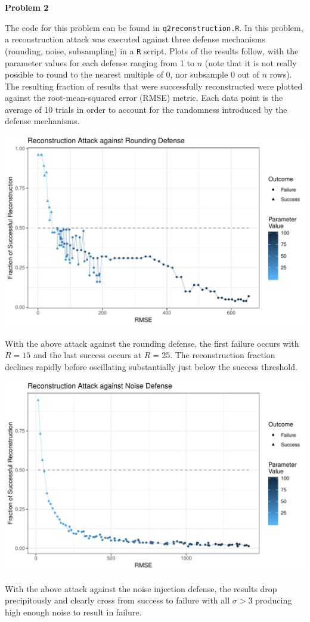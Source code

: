 \documentclass[12pt]{article}
\begin{document}
{\large\textbf{Problem 2}}

The code for this problem can be found in \texttt{q2reconstruction.R}. In this problem, a reconstruction attack was executed against three defense mechanisms (rounding, noise, subsampling) in a \texttt{R} script. Plots of the results follow, with the parameter values for each defense ranging from 1 to $n$ (note that it is not really possible to round to the nearest multiple of 0, nor subsample 0 out of $n$ rows). The resulting fraction of results that were successfully reconstructed were plotted against the root-mean-squared error (RMSE) metric. Each data point is the average of 10 trials in order to account for the randomness introduced by the defense mechanisms.
\begin{center}
\includegraphics[width=\textwidth]{figs/attackrounding}
\end{center}
With the above attack against the rounding defense, the first failure occurs with $R = 15$ and the last success occurs at $R = 25$. The reconstruction fraction declines rapidly before oscillating substantially just below the success threshold.

\begin{center}
\includegraphics[width=\textwidth]{figs/attacknoise}
\end{center}
With the above attack against the noise injection defense, the results drop precipitously and clearly cross from success to failure with all $\sigma > 3$ producing high enough noise to result in failure.
\end{document}

